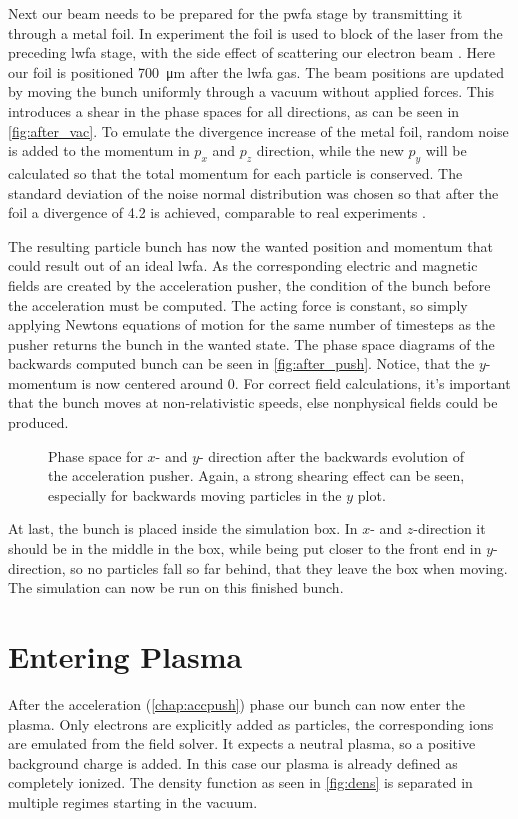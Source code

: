 \documentclass[bachelor_thesis]{subfiles}
\begin{document}
Next our beam needs to be prepared for the \gls{pwfa} stage by transmitting it through a metal foil. In experiment the foil is used to block of the laser from the preceding \gls{lwfa} stage, 
with the side effect of scattering our electron beam \cite{Raj2020}. Here our foil is positioned \qty{700}{\um} after the \gls{lwfa} gas.
The beam positions are updated by moving the bunch uniformly through a vacuum without applied forces. This introduces a shear in the phase spaces for all directions, as can be seen in \autoref{fig:after_vac}.
To emulate the divergence increase of the metal foil, random noise is added to the momentum in $p_x$ and $p_z$ direction, while the new $p_y$ will be calculated so that the total momentum for each particle is conserved.
The standard deviation of the noise normal distribution was chosen so that after the foil a divergence of \qty{4.2}{\mrad} is achieved, comparable to real experiments \cite{Schoebel2022}.

The resulting particle bunch has now the wanted position and momentum that could result out of an ideal \gls{lwfa}. As the corresponding  electric and magnetic fields are created by the acceleration pusher,
the condition of the bunch before the acceleration must be computed. The acting force is constant, so simply applying Newtons equations of motion for the same number of timesteps as the pusher returns the bunch in the wanted state.
The phase space diagrams of the backwards computed bunch can be seen in \autoref {fig:after_push}. Notice, that the $y$-momentum is now centered around \num{0}. For correct field calculations, it's important that the bunch moves at non-relativistic speeds,
else nonphysical fields could be produced.

\begin{figure}
	\missingfigure{}
	\caption{Phase space for $x$- and $y$- direction after the backwards evolution of the acceleration pusher. Again, a strong shearing effect can be seen, especially for backwards moving particles in the $y$ plot.}
	\label{fig:after_push}
\end{figure}

At last, the bunch is placed inside the simulation box. In $x$- and $z$-direction it should be in the middle in the box, while being put closer to the front end in $y$-direction, so no particles fall so far behind, that they leave the box when moving.
The simulation can now be run on this finished bunch.

\section{Entering Plasma}\label{chap:plasma}
 After the acceleration (\autoref{chap:accpush}) phase our bunch can now enter the plasma.
Only electrons are explicitly added as particles, the corresponding ions are emulated from the field solver. It expects a neutral plasma, so a positive background charge is added. 
In this case our plasma is already defined as completely ionized. 
The density function as seen in \autoref{fig:dens} is separated in multiple regimes starting in the vacuum. 
\end{document}
